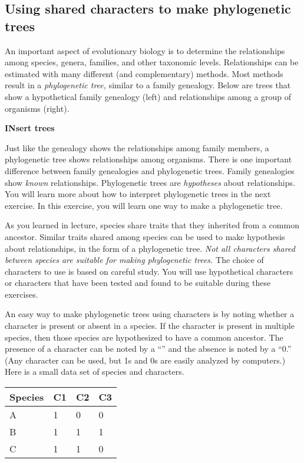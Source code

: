 \documentclass[12pt, hidelinks]{exam}
\begin{document}
\subsection*{Using shared characters to make phylogenetic trees}

An important aspect of evolutionary biology is to determine the relationships among species, genera, families, and other taxonomic levels. Relationships can be estimated with many different (and complementary) methods.  Most methods result in a \emph{phylogenetic tree,} similar to a family genealogy. Below are trees that show a hypothetical family genealogy (left) and relationships among a group of organisms (right). 

\textbf{INsert trees}

Just like the genealogy shows the relationships among family members, a phylogenetic tree shows relationships among organisms.  There is one important difference between family genealogies and phylogenetic trees. Family genealogies show \emph{known} relationships. Phylogenetic trees are \emph{hypotheses} about relationships. You will learn more about how to interpret phylogenetic trees in the next exercise. In this exercise, you will learn one way to make a phylogenetic tree.

As you learned in lecture, species share traits that they inherited from a common ancestor. Similar traits shared among species can be used to make hypothesis about relationships, in the form of a phylogenetic tree. \emph{Not all characters shared between species are suitable for making phylogenetic trees.} The choice of characters to use is based on careful study. You will use hypothetical characters or characters that have been tested and found to be suitable during these exercises.

An easy way to make phylogenetic trees using characters is by noting whether a character is present or absent in a species. If the character is present in multiple species, then those species are hypothesized to have a common ancestor.  The presence of a character can be noted by a “{” and the absence is noted by a “0}.” (Any character can be used, but 1s and 0s are easily analyzed by computers.) Here is a small data set of species and characters.

{\liningnum
\begin{center}
	\begin{tabular}{llll}
	\toprule
		Species	&	C1	&	C2	&	C3	\tabularnewline
	\midrule
		A	&	1	&	0	&	0	\tabularnewline
		B	&	1	&	1	&	1	\tabularnewline
		C	& 1	&	1	&	0	\tabularnewline
	\bottomrule
	\end{tabular}
\end{center}
}
\end{document}
